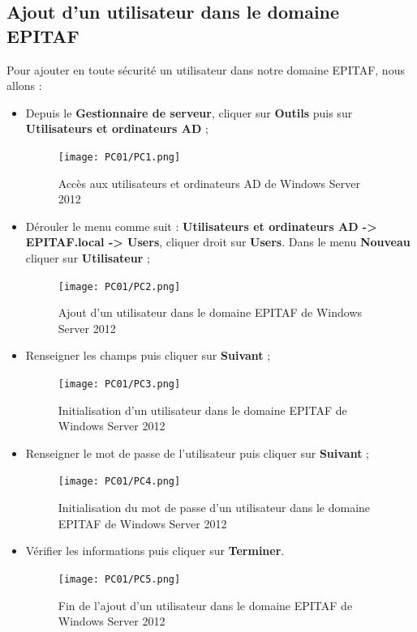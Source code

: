 \newpage
\subsection{Ajout d'un utilisateur dans le domaine EPITAF}

Pour ajouter en toute sécurité un utilisateur dans notre domaine EPITAF, nous allons :
\begin{itemize}

\item Depuis le \textbf{Gestionnaire de serveur}, cliquer sur \textbf{Outils} puis sur \textbf{Utilisateurs et ordinateurs AD} ;
\begin{figure}[h!]
    \begin{center}
        \texttt{[image: PC01/PC1.png]}
        \caption{Accès aux utilisateurs et ordinateurs AD de Windows Server 2012}
    \end{center}
\end{figure}
\FloatBarrier

\item Dérouler le menu comme suit : \textbf{Utilisateurs et ordinateurs AD -> EPITAF.local -> Users}, cliquer droit sur \textbf{Users}. Dans le menu \textbf{Nouveau} cliquer sur \textbf{Utilisateur} ;
\begin{figure}[h!]
    \begin{center}
        \texttt{[image: PC01/PC2.png]}
        \caption{Ajout d'un utilisateur dans le domaine EPITAF de Windows Server 2012}
    \end{center}
\end{figure}
\FloatBarrier

\item Renseigner les champs puis cliquer sur \textbf{Suivant} ;
\begin{figure}[h!]
    \begin{center}
        \texttt{[image: PC01/PC3.png]}
        \caption{Initialisation d'un utilisateur dans le domaine EPITAF de Windows Server 2012}
    \end{center}
\end{figure}
\FloatBarrier

\item Renseigner le mot de passe de l'utilisateur puis cliquer sur \textbf{Suivant} ;
\begin{figure}[h!]
    \begin{center}
        \texttt{[image: PC01/PC4.png]}
        \caption{Initialisation du mot de passe d'un utilisateur dans le domaine EPITAF de Windows Server 2012}
    \end{center}
\end{figure}
\FloatBarrier

\item Vérifier les informations puis cliquer sur \textbf{Terminer}.
\begin{figure}[h!]
    \begin{center}
        \texttt{[image: PC01/PC5.png]}
        \caption{Fin de l'ajout d'un utilisateur dans le domaine EPITAF de Windows Server 2012}
    \end{center}
\end{figure}
\FloatBarrier
\end{itemize}

